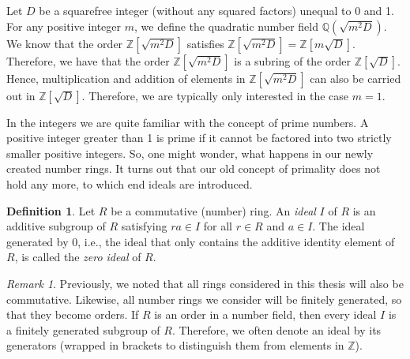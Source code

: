 \documentclass[openany, a4paper, 10pt]{book}
\theoremstyle{plain}
\theoremstyle{plain}
\theoremstyle{plain}
\theoremstyle{definition}
\newtheorem{definition}[theorem]{Definition}
\theoremstyle{plain}
\theoremstyle{definition}
\theoremstyle{remark}
\newtheorem*{remark}{Remark}
\begin{document}
\begin{examplebox}
    Let $D$ be a squarefree integer (without any squared factors) unequal to 0 and 1.
    For any positive integer $m$, we define the quadratic number field $\mathbb Q(\sqrt{m^2D})$.
    We know that the order $\mathbb Z[\sqrt{m^2D}]$ satisfies
    $\mathbb Z[\sqrt{m^2D}] = \mathbb Z[m \sqrt{D}]$.
    Therefore, we have that the order $\mathbb Z[\sqrt{m^2 D}]$ is a subring of the order $\mathbb Z[\sqrt{D}]$.
    Hence, multiplication and addition of elements in $\mathbb Z[\sqrt{m^2D}]$ can also be carried out in $\mathbb Z[\sqrt D]$.
    Therefore, we are typically only interested in the case $m=1$.
\end{examplebox}

In the integers we are quite familiar with the concept of prime numbers.
A positive integer greater than 1 is prime if it cannot be factored into two strictly smaller positive integers.
So, one might wonder, what happens in our newly created number rings.
It turns out that our old concept of primality does not hold any more, to which end ideals are introduced.

\begin{definition}
    Let $R$ be a commutative (number) ring.
    An \textit{ideal} $I$ of $R$ is an additive subgroup of $R$ satisfying $ra \in I$ for all $r \in R$ and $a \in I$.
    The ideal generated by $0$, i.e., the ideal that only contains the additive identity element of $R$, is called the \textit{zero ideal} of $R$.
\end{definition}
\begin{remark}
    Previously, we noted that all rings considered in this thesis will also be commutative.
    Likewise, all number rings we consider will be finitely generated, so that they become orders.
    If $R$ is an order in a number field, then every ideal $I$ is a finitely generated subgroup of $R$.
    Therefore, we often denote an ideal by its generators (wrapped in brackets to distinguish them from elements in $\mathbb Z$).
\end{remark}
\end{document}
